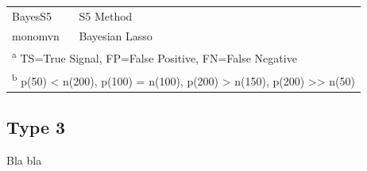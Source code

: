 \documentclass[
  11pt,
]{article}
\begin{document}
\begin{table}[!h]
\begin{tabular}[t]{>{}l|>{}l|>{}l|>{}l|>{}l|>{}l|>{}l|>{}l|>{}l|>{}l|>{}l|>{}l|>{}l|>{}l|>{}l|>{}l|>{}l|}
\hspace{1em}BayesS5 & S5 Method &  &  &  &  &  &  &  &  &  &  &  &  &  &  & \\
\hspace{1em}monomvn & Bayesian Lasso &  &  &  &  &  &  &  &  &  &  &  &  &  &  & \\
\bottomrule
\multicolumn{17}{l}{\textsuperscript{a} TS=True Signal, FP=False Positive, FN=False Negative}\\
\multicolumn{17}{l}{\textsuperscript{b} p(50) < n(200), p(100) = n(100), p(200) > n(150), p(200) >> n(50)}\\
\end{tabular}
\end{table}

\subsection{Type 3}

Bla bla
\end{document}
